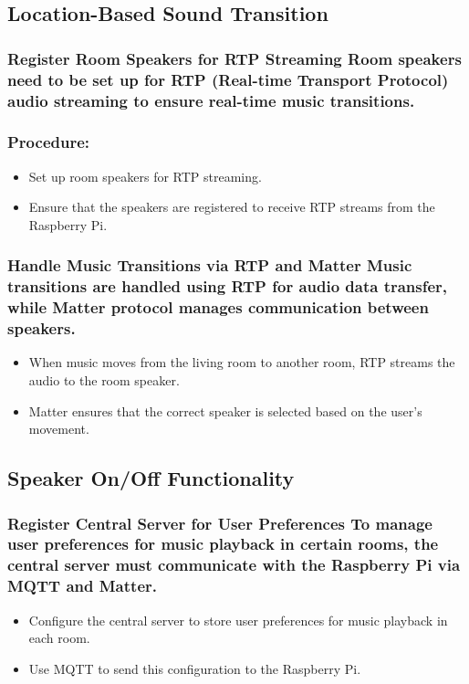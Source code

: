 \documentclass[conference]{IEEEtran}
\begin{document}
\subsection{Location-Based Sound Transition}

\subsubsection{Register Room Speakers for RTP Streaming Room speakers need to be set up for RTP (Real-time Transport Protocol) audio streaming to ensure real-time music transitions. \\\\Procedure:}
\begin{itemize}
    \item Set up room speakers for RTP streaming.\\
    \item Ensure that the speakers are registered to receive RTP streams from the Raspberry Pi.\\
\end{itemize}

\subsubsection{Handle Music Transitions via RTP and Matter Music transitions are handled using RTP for audio data transfer, while Matter protocol manages communication between speakers.}
\begin{itemize}
    \item When music moves from the living room to another room, RTP streams the audio to the room speaker.\\
    \item Matter ensures that the correct speaker is selected based on the user’s movement.\\
\end{itemize}


\subsection{Speaker On/Off Functionality}

\subsubsection{Register Central Server for User Preferences To manage user preferences for music playback in certain rooms, the central server must communicate with the Raspberry Pi via MQTT and Matter.}
\begin{itemize}
    \item Configure the central server to store user preferences for music playback in each room.\\
    \item Use MQTT to send this configuration to the Raspberry Pi.\\
\end{itemize}
\end{document}
